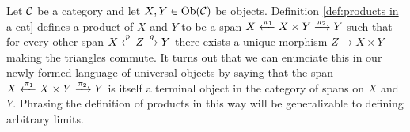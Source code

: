 \documentclass[CT4S-EN-RU]{subfiles}
\begin{document}
\subsubsection{}\label{sec:examples of limits}

\begin{blockENG}
Let $\mathcal{C}$ be a category and let $X,Y\in\textnormal{Ob}(\mathcal{C})$ be objects. Definition \ref{def:products in a cat} defines a product  of $X$ and $Y$ to be a span $X\xleftarrow{\pi_1}X\times Y\xrightarrow{\pi_2}Y$ such that for every other span $X\xleftarrow{p}Z\xrightarrow{q}Y$ there exists a unique morphism $Z\to X\times Y$ making the triangles commute. It turns out that we can enunciate this in our newly formed language of universal objects by saying that the span $X\xleftarrow{\pi_1}X\times Y\xrightarrow{\pi_2}Y$ is itself a terminal object in the category of spans on $X$ and $Y$. Phrasing the definition of products in this way will be generalizable to defining arbitrary limits.
\end{blockENG}

\begin{blockRUS}
\end{blockRUS}
\end{document}
